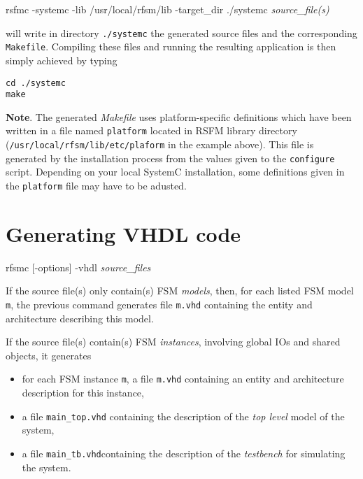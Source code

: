 \begin{FVerbatim}[commandchars=\\\{\}]
rsfmc -systemc -lib /usr/local/rfsm/lib -target_dir ./systemc \emph{source_file(s)}
\end{FVerbatim}

will write in directory \verb|./systemc| the generated source files and the corresponding
\verb|Makefile|. Compiling these files and running the resulting application is then simply achieved
by typing

\begin{verbatim}
cd ./systemc
make 
\end{verbatim}

\medskip
\textbf{Note}. The generated \emph{Makefile} uses platform-specific definitions which have been
written in a file named \verb|platform| located in RSFM library directory
(\verb|/usr/local/rfsm/lib/etc/plaform| in the example above). This file is generated by
the installation process from the values given to the \verb|configure| script. Depending on your
local SystemC installation, some definitions given in the \verb|platform| file may have to be
adusted.

\section{Generating VHDL code}
\label{sec:generating-vhdl-code}

\begin{FVerbatim}[commandchars=\\\{\}]
rfsmc [-options] -vhdl \emph{source_files}
\end{FVerbatim}

If the source file(s) only contain(s) FSM \emph{models}, then, for each listed FSM model \texttt{m}, 
the previous command generates file \verb|m.vhd| containing the entity and architecture describing
this model.

\medskip
If the source file(s) contain(s) FSM \emph{instances}, involving global IOs
and shared objects, it generates
\begin{itemize}
\item for each FSM instance \verb|m|, a file \verb|m.vhd| containing an entity and architecture
  description for this instance,
\item a file \verb|main_top.vhd| containing the description of the \emph{top level} model of the
  system,
\item a file \verb|main_tb.vhd|containing the description of the \emph{testbench} for
  simulating the system.
\end{itemize}

